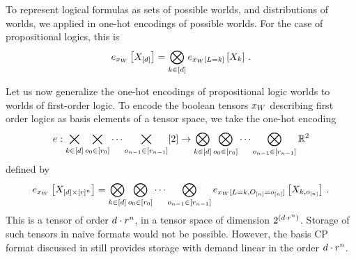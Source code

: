 
To represent logical formulas as sets of possible worlds, and distributions of worlds, we applied in  one-hot encodings of possible worlds.
For the case of propositional logics, this is
\begin{align*}
    e_{x_{W}}\left[X_{[d]}\right] = \bigotimes_{k\in[d]} e_{x_{W}[L=k]}\left[X_{k}\right] \, .
\end{align*}


Let us now generalize the one-hot encodings of propositional logic worlds to worlds of first-order logic.
To encode the boolean tensors $x_{W}$ describing first order logics as basis elements of a tensor space, we take the one-hot encoding
\begin{align*}
    e :
    \bigtimes_{k\in[d]}\bigtimes_{o_{0}\in[r_{0}]}\cdots\bigtimes_{o_{n-1}\in[r_{n-1}]} [2]
    \rightarrow \bigotimes_{k\in[d]}\bigotimes_{o_{0}\in[r_{0}]}\cdots\bigotimes_{o_{n-1}\in[r_{n-1}]} \mathbb{R}^2
\end{align*}
defined by
\begin{align*}
    e_{x_{W}}\left[X_{[d]\times[r]^{n}}\right]
    = \bigotimes_{k\in[d]}\bigotimes_{o_{0}\in[r_{0}]}\cdots\bigotimes_{o_{n-1}\in[r_{n-1}]}
    e_{x_{W}[L=k,O_{[n]}=o_{[n]}]}\left[X_{k,o_{[n]}}\right] \, .
\end{align*}
This is a tensor of order $d\cdot r^{n}$, in a tensor space of dimension $2^{\left(d\cdot r^{n}\right)}$.
Storage of such tensors in naive formats would not be possible.
However, the basis CP format discussed in  still provides storage with demand linear in the order $d\cdot r^{n}$.

